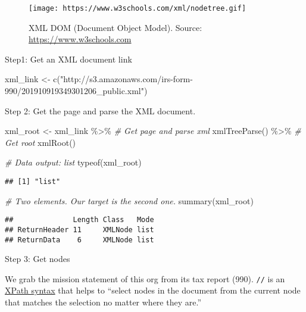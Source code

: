 \documentclass[
]{book}
\newenvironment{Shaded}{\begin{snugshade}}{\end{snugshade}}
\newcommand{\CommentTok}[1]{\textcolor[rgb]{0.56,0.35,0.01}{\textit{#1}}}
\newcommand{\FunctionTok}[1]{\textcolor[rgb]{0.00,0.00,0.00}{#1}}
\newcommand{\NormalTok}[1]{#1}
\newcommand{\OtherTok}[1]{\textcolor[rgb]{0.56,0.35,0.01}{#1}}
\newcommand{\SpecialCharTok}[1]{\textcolor[rgb]{0.00,0.00,0.00}{#1}}
\newcommand{\StringTok}[1]{\textcolor[rgb]{0.31,0.60,0.02}{#1}}
\begin{document}
\begin{figure}
\centering
\texttt{[image: https://www.w3schools.com/xml/nodetree.gif]}
\caption{XML DOM (Document Object Model). Source: \url{https://www.w3schools.com}}
\end{figure}

Step1: Get an XML document link

\begin{Shaded}
\begin{Highlighting}[]
\NormalTok{xml\_link }\OtherTok{\textless{}{-}} \FunctionTok{c}\NormalTok{(}\StringTok{"http://s3.amazonaws.com/irs{-}form{-}990/201910919349301206\_public.xml"}\NormalTok{)}
\end{Highlighting}
\end{Shaded}

Step 2: Get the page and parse the XML document.

\begin{Shaded}
\begin{Highlighting}[]
\NormalTok{xml\_root }\OtherTok{\textless{}{-}}\NormalTok{ xml\_link }\SpecialCharTok{\%\textgreater{}\%}
  \CommentTok{\# Get page and parse xml }
  \FunctionTok{xmlTreeParse}\NormalTok{() }\SpecialCharTok{\%\textgreater{}\%}
  \CommentTok{\# Get root}
  \FunctionTok{xmlRoot}\NormalTok{()}

\CommentTok{\# Data output: list }
\FunctionTok{typeof}\NormalTok{(xml\_root) }
\end{Highlighting}
\end{Shaded}

\begin{verbatim}
## [1] "list"
\end{verbatim}

\begin{Shaded}
\begin{Highlighting}[]
\CommentTok{\# Two elements. Our target is the second one.}
\FunctionTok{summary}\NormalTok{(xml\_root)}
\end{Highlighting}
\end{Shaded}

\begin{verbatim}
##              Length Class   Mode
## ReturnHeader 11     XMLNode list
## ReturnData    6     XMLNode list
\end{verbatim}

Step 3: Get nodes

We grab the mission statement of this org from its tax report (990). \texttt{//} is an \href{https://www.w3schools.com/xml/xpath_syntax.asp}{XPath syntax} that helps to ``select nodes in the document from the current node that matches the selection no matter where they are.''
\end{document}
